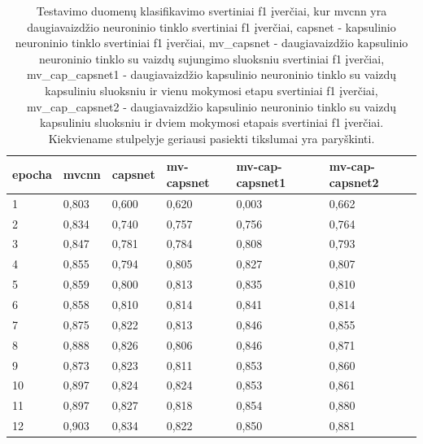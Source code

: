 \begin{table}[]
	\begin{tabular}{l|l|l|l|l|l}
		epocha & mvcnn & capsnet & mv-capsnet & mv-cap-capsnet1 & mv-cap-capsnet2 \\
		\hline
		1 & 0,803 &   0,600 &      0,620 &           0,003 &           0,662 \\
		2 & 0,834 &   0,740 &      0,757 &           0,756 &           0,764 \\
		3 & 0,847 &   0,781 &      0,784 &           0,808 &           0,793 \\
		4 & 0,855 &   0,794 &      0,805 &           0,827 &           0,807 \\
		5 & 0,859 &   0,800 &      0,813 &           0,835 &           0,810 \\
		6 & 0,858 &   0,810 &      0,814 &           0,841 &           0,814 \\
		7 & 0,875 &   0,822 &      0,813 &           0,846 &           0,855 \\
		8 & 0,888 &   0,826 &      0,806 &           0,846 &           0,871 \\
		9 & 0,873 &   0,823 &      0,811 &           0,853 &           0,860 \\
		10 & 0,897 &   0,824 &      0,824 &           0,853 &           0,861 \\
		11 & 0,897 &   0,827 &      0,818 &           0,854 &           0,880 \\
		12 & 0,903 &   0,834 &      0,822 &           0,850 &           0,881 \\
	\end{tabular}
	\caption{
		Testavimo duomenų klasifikavimo svertiniai f1 įverčiai, kur mvcnn yra daugiavaizdžio neuroninio tinklo svertiniai f1 įverčiai, capsnet - kapsulinio neuroninio tinklo svertiniai f1 įverčiai, mv\_capsnet - daugiavaizdžio kapsulinio neuroninio tinklo su vaizdų sujungimo sluoksniu svertiniai f1 įverčiai, mv\_cap\_capsnet1 - daugiavaizdžio kapsulinio neuroninio tinklo su vaizdų kapsuliniu sluoksniu ir vienu mokymosi etapu svertiniai f1 įverčiai, mv\_cap\_capsnet2 - daugiavaizdžio kapsulinio neuroninio tinklo su vaizdų kapsuliniu sluoksniu ir dviem mokymosi etapais svertiniai f1 įverčiai. Kiekviename stulpelyje geriausi pasiekti tikslumai yra paryškinti.
	}
	\label{tbl:weighted_f1}
\end{table}

